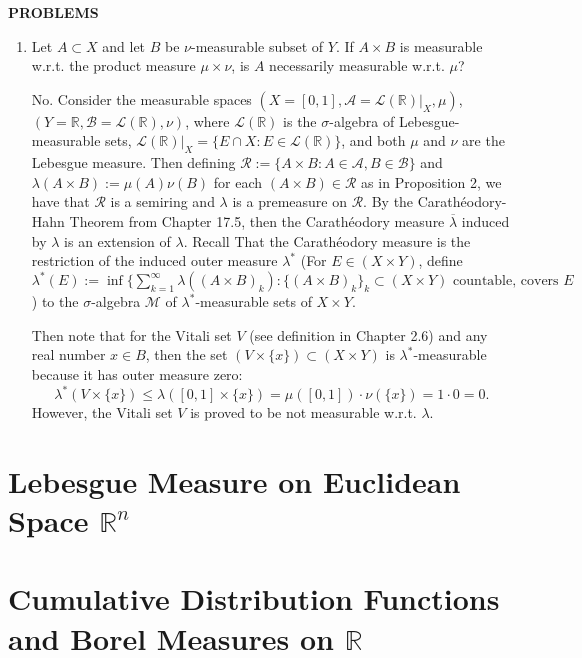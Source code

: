 \begin{center}
	\textbf{PROBLEMS}
\end{center}
\begin{enumerate}
	\setcounter{enumi}{0}
    \item Let $A\subset X$ and let $B$ be $\nu$-measurable subset of $Y$.
    If $A\times B$ is measurable w.r.t. the product measure $\mu\times\nu$, is $A$ necessarily measurable w.r.t. $\mu$?
    
    No.
    Consider the measurable spaces $(X=[0,1],\mathcal{A}=\mathcal{L}(\mathbb{R})|_X,\mu)$, $(Y=\mathbb{R},\mathcal{B}=\mathcal{L}(\mathbb{R}),\nu)$, where $\mathcal{L}(\mathbb{R})$ is the $\sigma$-algebra of Lebesgue-measurable sets, $\mathcal{L}(\mathbb{R})|_X=\{E\cap X:E\in\mathcal{L}(\mathbb{R})\}$, and both $\mu$ and $\nu$ are the Lebesgue measure.
    Then defining $\mathcal{R}:=\{A\times B:A\in\mathcal{A},B\in\mathcal{B}\}$ and $\lambda(A\times B):=\mu(A)\nu(B)$ for each $(A\times B)\in\mathcal{R}$ as in Proposition 2, we have that $\mathcal{R}$ is a semiring and $\lambda$ is a premeasure on $\mathcal{R}$.
    By the Carath\'eodory-Hahn Theorem from Chapter 17.5, then the Carath\'eodory measure $\overline\lambda$ induced by $\lambda$ is an extension of $\lambda$.
    Recall That the Carath\'eodory measure is the restriction of the induced outer measure $\lambda^*$ (For $E\in(X\times Y)$, define $\lambda^*(E):=\inf\{\sum_{k=1}^\infty\lambda((A\times B)_k):\{(A\times B)_k\}_k\subset (X\times Y)\text{ countable, covers }E $) to the $\sigma$-algebra $\mathcal{M}$ of $\lambda^*$-measurable sets of $X\times Y$.
    
    Then note that for the Vitali set $V$ (see definition in Chapter 2.6) and any real number $x\in B$, then the set $(V\times \{x\})\subset(X\times Y)$ is $\lambda^*$-measurable because it has outer measure zero: 
    \[
        \lambda^*(V\times\{x\})\le\lambda([0,1]\times\{x\})=\mu([0,1])\cdot\nu(\{x\})=1\cdot0=0.
    \]
    However, the Vitali set $V$ is proved to be not measurable w.r.t. $\lambda$.

\end{enumerate}

\section{Lebesgue Measure on Euclidean Space $\mathbb{R}^n$}

\section{Cumulative Distribution Functions and Borel Measures on $\mathbb{R}$}

